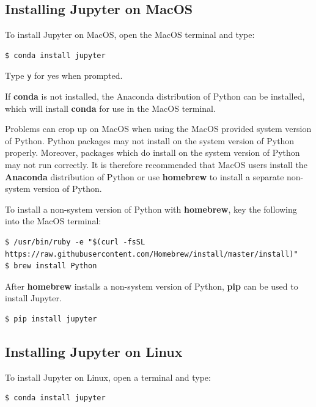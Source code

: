 \documentclass{book}
\begin{document}
    
        \subsection{Installing Jupyter on
MacOS}\label{installing-jupyter-on-macos}

To install Jupyter on MacOS, open the MacOS terminal and type:

\begin{lstlisting}
$ conda install jupyter
\end{lstlisting}

Type \lstinline!y! for yes when prompted.

If \textbf{conda} is not installed, the Anaconda distribution of Python
can be installed, which will install \textbf{conda} for use in the MacOS
terminal.

Problems can crop up on MacOS when using the MacOS provided system
version of Python. Python packages may not install on the system version
of Python properly. Moreover, packages which do install on the system
version of Python may not run correctly. It is therefore recommended
that MacOS users install the \textbf{Anaconda} distribution of Python or
use \textbf{homebrew} to install a separate non-system version of
Python.

To install a non-system version of Python with \textbf{homebrew}, key
the following into the MacOS terminal:

\begin{lstlisting}
$ /usr/bin/ruby -e "$(curl -fsSL https://raw.githubusercontent.com/Homebrew/install/master/install)"
$ brew install Python
\end{lstlisting}

After \textbf{homebrew} installs a non-system version of Python,
\textbf{pip} can be used to install Jupyter.

\begin{lstlisting}
$ pip install jupyter
\end{lstlisting}
    




    
        \subsection{Installing Jupyter on
Linux}\label{installing-jupyter-on-linux}

To install Jupyter on Linux, open a terminal and type:

\begin{lstlisting}
$ conda install jupyter
\end{lstlisting}
\end{document}
